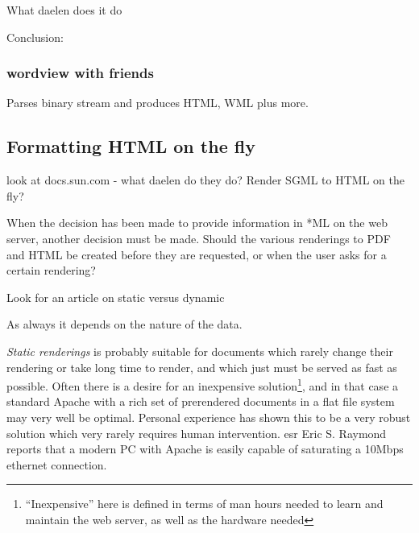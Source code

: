 \textsf{What daelen does it do}      
      
\textsf{Conclusion:}

\subsubsection{wordview with friends}

\textsf{Parses binary stream and produces HTML, WML plus more.  }


\subsection{Formatting HTML on the fly}

\textsf{look at docs.sun.com - what daelen do they do?  Render SGML to
  HTML on the fly?}

When the decision has been made to provide information in *ML on the
web server, another decision must be made.  Should the various
renderings to PDF and HTML be created before they are requested, or
when the user asks for a certain rendering?


      

\textsf{Look for an article on static versus dynamic}

As always it depends on the nature of the data.

\textit{Static renderings} is probably suitable for documents which
rarely change their rendering or take long time to render, and which
just must be served as fast as possible.  Often there is a desire for
an inexpensive solution\footnote{``Inexpensive'' here is defined in
  terms of man hours needed to learn and maintain the web server, as
  well as the hardware needed}, and in that case a standard Apache
with a rich set of prerendered documents in a flat file system may
very well be optimal.  Personal experience has shown this to be a very
robust solution which very rarely requires human intervention.
\textsf{esr} Eric S. Raymond reports that a modern PC with Apache is
easily capable of saturating a 10Mbps ethernet connection.

